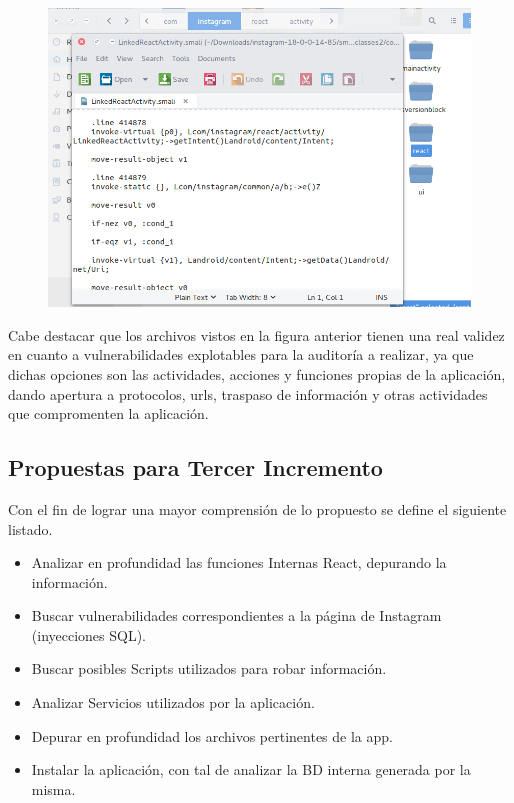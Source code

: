 \documentclass[a4paper,11pt]{article}
\theoremstyle{mytheor}
\begin{document}
\begin{itemize}
           
     \begin{figure}[!h]
    \centering
    \includegraphics[scale=0.5]{react.png}
    \label{fig:my_label}
    \end{figure}
    
    Cabe destacar que los archivos vistos en la figura anterior tienen una real validez en cuanto a vulnerabilidades explotables para la auditoría a realizar, ya que dichas opciones son las actividades, acciones y funciones propias de la aplicación, dando apertura a protocolos, urls, traspaso de información y otras actividades que compromenten la aplicación.
    
    
    
\end{itemize}


\subsection{Propuestas para Tercer Incremento}

Con el fin de lograr una mayor comprensión de lo propuesto se define el siguiente listado.

\begin{itemize}
    \item Analizar en profundidad las funciones Internas React, depurando la información.
    \item Buscar vulnerabilidades correspondientes a la página de Instagram (inyecciones SQL).
    \item Buscar posibles Scripts utilizados para robar información.
    \item Analizar Servicios utilizados por la aplicación.
    \item Depurar en profundidad los archivos pertinentes de la app.
    \item Instalar la aplicación, con tal de analizar la BD interna generada por la misma.
\end{itemize}
\end{document}
